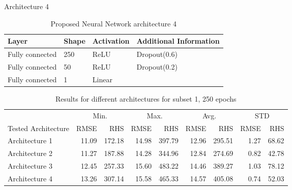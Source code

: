 Architecture 4

\begin{table}[!htb]
\centering
\begin{tabular}{l l l l}
	\hline
	Layer & Shape & Activation & Additional Information\\
  	\hline
  	Fully connected & 250 & ReLU & Dropout(0.6)\\
  	Fully connected & 50 & ReLU & Dropout(0.2)\\
  	Fully connected & 1 & Linear & \\
  	\hline
\end{tabular}
\caption{Proposed Neural Network architecture 4}
\label{table:proposed_nn_4}
\end{table}

\begin{table}[!htb]
\centering
\begin{tabular}{l r r | r r | r r | r r}
	\hline	
	& \multicolumn{2}{c}{Min.} & \multicolumn{2}{c}{Max.}  & \multicolumn{2}{c}{Avg.}  & \multicolumn{2}{c}{STD} \\
	Tested Architecture & RMSE & RHS & RMSE & RHS & RMSE & RHS & RMSE & RHS\\
  	\hline
  	Architecture 1 & 11.09 & 172.18 & 14.98 & 397.79 & 12.96 & 295.51 & 1.27 & 68.62\\
  	Architecture 2 & 11.27 & 187.88 & 14.28 & 344.96 & 12.84 & 274.69 & 0.82 & 42.78\\
  	Architecture 3 & 12.45 & 257.33 & 15.60 & 483.22 & 14.46 & 389.27 & 1.03 & 78.12\\
  	Architecture 4 & 13.26 & 307.14 & 15.58 & 465.33 & 14.57 & 405.08 & 0.74 & 52.03\\
  	\hline
\end{tabular}
\caption{Results for different architectures for subset 1, 250 epochs}
\label{table:tested_architectures_250}
\end{table}